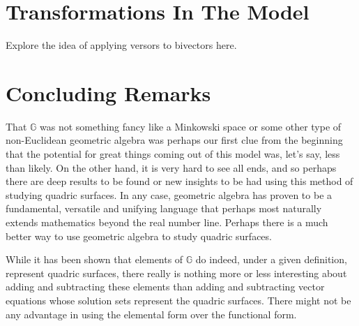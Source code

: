 \documentclass{ecgd-l}
\newcommand{\G}{\mathbb{G}}
\theoremstyle{definition}
\theoremstyle{remark}
\numberwithin{equation}{section}
\begin{document}
\section{Transformations In The Model}

Explore the idea of applying versors to bivectors here.


\section{Concluding Remarks}

That $\G$ was not something fancy like a Minkowski space or some other
type of non-Euclidean geometric algebra was perhaps our first clue from
the beginning that the potential for great things coming out of this model
was, let's say, less than likely.  On the other hand, it is very hard to see
all ends, and so perhaps there are deep results to be found or new insights
to be had using this method of studying quadric surfaces.  In any case,
geometric algebra has proven to be a fundamental, versatile and unifying
language that perhaps most naturally extends mathematics beyond the real number line.  Perhaps
there is a much better way to use geometric algebra to study quadric surfaces.

While it has been shown that elements of $\G$ do indeed, under a given
definition, represent quadric surfaces, there really is nothing more or less
interesting about adding and subtracting these elements than adding and
subtracting vector equations whose solution sets represent the quadric surfaces.
There might not be any advantage in using the elemental form over the
functional form.





\end{document}
